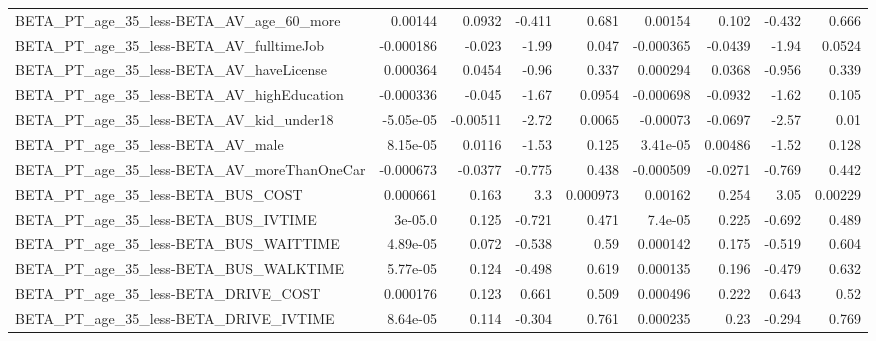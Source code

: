 \begin{tabular}{lrrrrrrrr}
BETA\_PT\_age\_35\_less-BETA\_AV\_age\_60\_more            &     0.00144 &       0.0932 &   -0.411 &    0.681 &    0.00154 &       0.102 &       -0.432 &         0.666 \\
BETA\_PT\_age\_35\_less-BETA\_AV\_fulltimeJob            &   -0.000186 &       -0.023 &    -1.99 &    0.047 &  -0.000365 &     -0.0439 &        -1.94 &        0.0524 \\
BETA\_PT\_age\_35\_less-BETA\_AV\_haveLicense            &    0.000364 &       0.0454 &    -0.96 &    0.337 &   0.000294 &      0.0368 &       -0.956 &         0.339 \\
BETA\_PT\_age\_35\_less-BETA\_AV\_highEducation          &   -0.000336 &       -0.045 &    -1.67 &   0.0954 &  -0.000698 &     -0.0932 &        -1.62 &         0.105 \\
BETA\_PT\_age\_35\_less-BETA\_AV\_kid\_under18            &   -5.05e-05 &     -0.00511 &    -2.72 &   0.0065 &   -0.00073 &     -0.0697 &        -2.57 &          0.01 \\
BETA\_PT\_age\_35\_less-BETA\_AV\_male                   &    8.15e-05 &       0.0116 &    -1.53 &    0.125 &   3.41e-05 &     0.00486 &        -1.52 &         0.128 \\
BETA\_PT\_age\_35\_less-BETA\_AV\_moreThanOneCar         &   -0.000673 &      -0.0377 &   -0.775 &    0.438 &  -0.000509 &     -0.0271 &       -0.769 &         0.442 \\
BETA\_PT\_age\_35\_less-BETA\_BUS\_COST                  &    0.000661 &        0.163 &      3.3 & 0.000973 &    0.00162 &       0.254 &         3.05 &       0.00229 \\
BETA\_PT\_age\_35\_less-BETA\_BUS\_IVTIME                &     3e-05.0 &        0.125 &   -0.721 &    0.471 &    7.4e-05 &       0.225 &       -0.692 &         0.489 \\
BETA\_PT\_age\_35\_less-BETA\_BUS\_WAITTIME              &    4.89e-05 &        0.072 &   -0.538 &     0.59 &   0.000142 &       0.175 &       -0.519 &         0.604 \\
BETA\_PT\_age\_35\_less-BETA\_BUS\_WALKTIME              &    5.77e-05 &        0.124 &   -0.498 &    0.619 &   0.000135 &       0.196 &       -0.479 &         0.632 \\
BETA\_PT\_age\_35\_less-BETA\_DRIVE\_COST                &    0.000176 &        0.123 &    0.661 &    0.509 &   0.000496 &       0.222 &        0.643 &          0.52 \\
BETA\_PT\_age\_35\_less-BETA\_DRIVE\_IVTIME              &    8.64e-05 &        0.114 &   -0.304 &    0.761 &   0.000235 &        0.23 &       -0.294 &         0.769 \\

\end{tabular}
